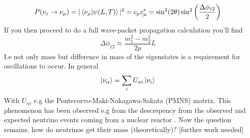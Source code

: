 \documentclass[11pt,a4paper,faculty=we,language=en,doctype=report]{cls/ugent-doc}
\begin{document}
\begin{equation}
	P(\nu_e\rightarrow\nu_\mu) = |\braket{\nu_\mu|\psi(L,T)}|^2 = c_\mu c_\mu^* = \sin ^2(2 \theta) \sin ^2\left(\frac{\Delta \phi_{12}}{2}\right)
\end{equation}
If you then proceed to do a full wave-packet propagation calculation you'll find
\begin{equation}
	\Delta \phi_{12} \approx \frac{m_1^2 - m_2^2}{2p}L
\end{equation}
I.e not only mass but difference in mass of the eigenstates is a requirement for oscillations to occur.
In general
\begin{equation}
	\ket{\nu_\alpha} = \sum_iU_{\alpha i} \ket{\nu_i}
\end{equation}
With $U_{\alpha i}$ e.g the Pontecorvo-Maki-Nakagawa-Sakata (PMNS) matrix. 
This phenomenon has been observed e.g from the descrepency from the observed
and expected neutrino events coming from a nuclear reactor \cite{Eguchi_2003}.
Now the question remains, how do neutrinos get their mass (theoretically)? [further work needed]
\end{document}
